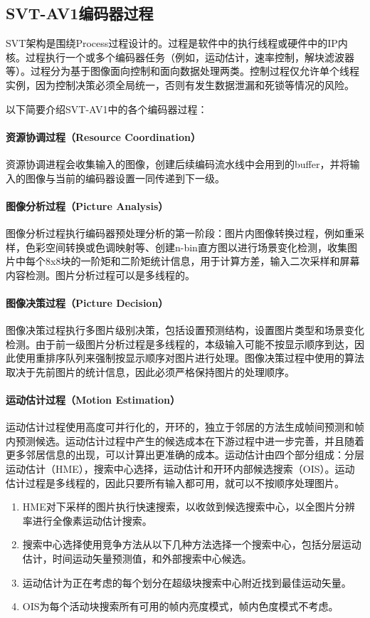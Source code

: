 \subsection{SVT-AV1编码器过程\cite{EncoderDesignSVTAV1}}
  SVT架构是围绕Process过程设计的。过程是软件中的执行线程或硬件中的IP内核。过程执行一个或多个编码器任务（例如，运动估计，速率控制，解块滤波器等）。过程分为基于图像面向控制和面向数据处理两类。控制过程仅允许单个线程实例，因为控制决策必须全局统一，否则有发生数据泄漏和死锁等情况的风险。

  以下简要介绍SVT-AV1中的各个编码器过程：
  \paragraph{资源协调过程（Resource Coordination）} 资源协调进程会收集输入的图像，创建后续编码流水线中会用到的buffer，并将输入的图像与当前的编码器设置一同传递到下一级。

  \paragraph{图像分析过程（Picture Analysis）} 图像分析过程执行编码器预处理分析的第一阶段：图片内图像转换过程，例如重采样，色彩空间转换或色调映射等、创建n-bin直方图以进行场景变化检测，收集图片中每个8x8块的一阶矩和二阶矩统计信息，用于计算方差，输入二次采样和屏幕内容检测。图片分析过程可以是多线程的。

  \paragraph{图像决策过程（Picture Decision）} 图像决策过程执行多图片级别决策，包括设置预测结构，设置图片类型和场景变化检测。由于前一级图片分析过程是多线程的，本级输入可能不按显示顺序到达，因此使用重排序队列来强制按显示顺序对图片进行处理。图像决策过程中使用的算法取决于先前图片的统计信息，因此必须严格保持图片的处理顺序。

  \paragraph{运动估计过程（Motion Estimation）} 运动估计过程使用高度可并行化的，开环的，独立于邻居的方法生成帧间预测和帧内预测候选。运动估计过程中产生的候选成本在下游过程中进一步完善，并且随着更多邻居信息的出现，可以计算出更准确的成本。运动估计由四个部分组成：分层运动估计（HME），搜索中心选择，运动估计和开环内部候选搜索（OIS）。运动估计过程是多线程的，因此只要所有输入都可用，就可以不按顺序处理图片。
  \begin{enumerate} [label=\arabic*)]
    \item HME对下采样的图片执行快速搜索，以收敛到候选搜索中心，以全图片分辨率进行全像素运动估计搜索。
    \item 搜索中心选择使用竞争方法从以下几种方法选择一个搜索中心，包括分层运动估计，时间运动矢量预测值，和外部搜索中心候选。
    \item 运动估计为正在考虑的每个划分在超级块搜索中心附近找到最佳运动矢量。
    \item OIS为每个活动块搜索所有可用的帧内亮度模式，帧内色度模式不考虑。
  \end{enumerate}

